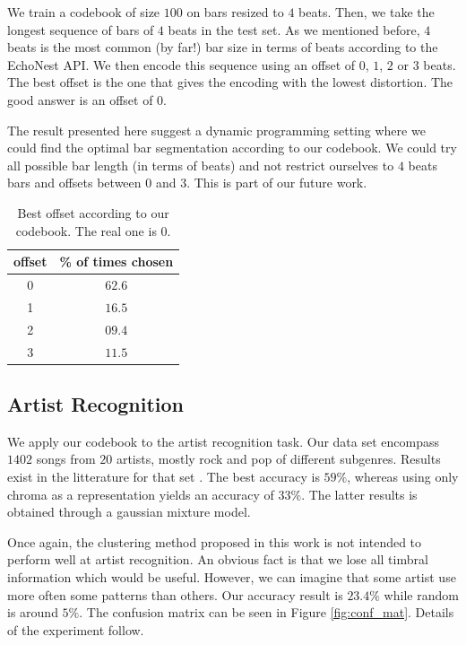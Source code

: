 \documentclass{article}
\begin{document}
We train a codebook of size $100$ on bars resized to $4$ beats. Then,
we take the longest sequence of bars of $4$ beats in the test set.
As we mentioned before, $4$ beats is the most common (by far!) bar size
in terms of beats according to the EchoNest API. We then encode this
sequence using an offset of $0$, $1$, $2$ or $3$ beats. The best offset
is the one that gives the encoding with the lowest distortion. The
good answer is an offset of $0$.

The result presented here suggest a dynamic programming setting where
we could find the optimal bar segmentation according to our codebook. 
We could try
all possible bar length (in terms of beats) and not restrict ourselves
to $4$ beats bars and offsets between $0$ and $3$. This is part of
our future work.

\begin{table}
\begin{center}
\begin{tabular}{c|c}
offset & \% of times chosen \\ \hline
0 & $\mathbf{62.6}$\\
1 & $16.5$\\
2 & $09.4$\\
3 & $11.5$\\
\end{tabular}
\end{center}
\caption{\small{
Best offset according to our codebook. The real one is $0$.
}}
\label{tab:offset}
\end{table}

\subsection{Artist Recognition}

We apply our codebook to the artist recognition task.
Our data set encompass $1402$ songs from $20$ artists, 
mostly rock and pop of different subgenres. Results exist in the
litterature for that set \cite{Ellis2007}. The best accuracy is
$59\%$, whereas using only chroma as a representation yields an
accuracy of $33\%$. The latter results is obtained through a
gaussian mixture model.

Once again, the clustering method proposed in this work is not
intended to perform well at artist recognition. An obvious fact is that
we lose all timbral information which would be useful. However, we can
imagine that some artist use more often some patterns than others.
Our accuracy result is $23.4\%$ while random
is around $5\%$. 
The confusion matrix can be seen in Figure \ref{fig:conf_mat}.
Details of the experiment follow.
\end{document}
